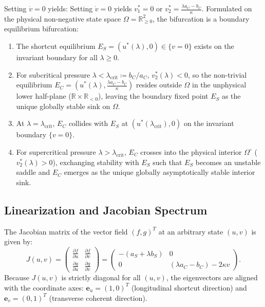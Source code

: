 \documentclass{article}
\theoremstyle{plain}
\theoremstyle{definition}
\begin{document}
Setting $\dot{v} = 0$ yields:
Setting $\dot{v} = 0$ yields $v_1^* = 0$ or $v_2^* = \frac{\lambda a_C - b_C}{\kappa}$. Formulated on the physical non-negative state space $\Omega = \mathbb{R}_{\ge 0}^2$, the bifurcation is a boundary equilibrium bifurcation:
\begin{enumerate}[leftmargin=*,noitemsep]
    \item The shortcut equilibrium $E_S = (u^*(\lambda), 0) \in \{v=0\}$ exists on the invariant boundary for all $\lambda \ge 0$.
    \item For subcritical pressure $\lambda < \lambda_{\text{crit}} \coloneqq b_C / a_C$, $v_2^*(\lambda) < 0$, so the non-trivial equilibrium $E_C = \left( u^*(\lambda), \frac{\lambda a_C - b_C}{\kappa} \right)$ resides outside $\Omega$ in the unphysical lower half-plane ($\mathbb{R} \times \mathbb{R}_{<0}$), leaving the boundary fixed point $E_S$ as the unique globally stable sink on $\Omega$.
    \item At $\lambda = \lambda_{\text{crit}}$, $E_C$ collides with $E_S$ at $(u^*(\lambda_{\text{crit}}), 0)$ on the invariant boundary $\{v=0\}$.
    \item For supercritical pressure $\lambda > \lambda_{\text{crit}}$, $E_C$ crosses into the physical interior $\Omega^\circ$ ($v_2^*(\lambda) > 0$), exchanging stability with $E_S$ such that $E_S$ becomes an unstable saddle and $E_C$ emerges as the unique globally asymptotically stable interior sink.
\end{enumerate}

\subsection{Linearization and Jacobian Spectrum}
The Jacobian matrix of the vector field $(f, g)^T$ at an arbitrary state $(u, v)$ is given by:
\begin{equation}
    J(u, v) = \begin{pmatrix}
        \frac{\partial f}{\partial u} & \frac{\partial f}{\partial v} \\
        \frac{\partial g}{\partial u} & \frac{\partial g}{\partial v}
    \end{pmatrix} = \begin{pmatrix}
        -(a_S + \lambda b_S) & 0 \\
        0 & (\lambda a_C - b_C) - 2\kappa v
    \end{pmatrix}.
\end{equation}
Because $J(u, v)$ is strictly diagonal for all $(u, v)$, the eigenvectors are aligned with the coordinate axes: $\mathbf{e}_u = (1, 0)^T$ (longitudinal shortcut direction) and $\mathbf{e}_v = (0, 1)^T$ (transverse coherent direction).
\end{document}
